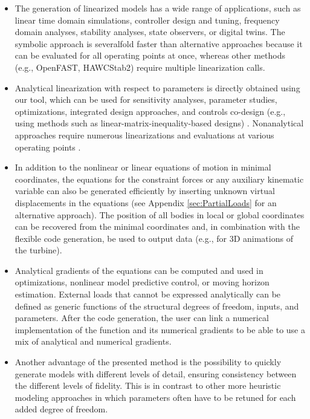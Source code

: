 \documentclass[wes, manuscript]{copernicus}
\begin{document}
\begin{itemize}
\item The generation of linearized models has a wide range of applications, such as linear time domain simulations, controller design and tuning, frequency domain analyses, stability analyses, state observers, or digital twins.
The symbolic approach is severalfold faster than alternative approaches because it can be evaluated for all operating points at once, whereas other methods (e.g., OpenFAST, HAWCStab2) require multiple linearization calls.

\item Analytical linearization with respect to parameters is directly obtained using our tool, which can be used for sensitivity analyses, parameter studies, optimizations, integrated design approaches, and controls co-design (e.g., using methods such as linear-matrix-inequality-based designs) \citep{Poschke:2020}.  Nonanalytical approaches require numerous linearizations and evaluations at various operating points \citep{Jonkman:2022lin}.

\item In addition to the nonlinear or linear equations of motion in minimal coordinates, the equations for the constraint forces or any auxiliary kinematic variable can also be generated efficiently by inserting unknown virtual displacements in the equations (see Appendix \ref{sec:PartialLoads} for an alternative approach). 
The position of all bodies in local or global coordinates can be recovered from the minimal coordinates and, in combination with the flexible code generation, be used to output data (e.g., for 3D animations of the turbine). 

\item Analytical gradients of the equations can be computed and used in optimizations,
nonlinear model predictive control, or moving horizon estimation.
    External loads that cannot be expressed analytically can be defined as generic functions of the structural degrees of freedom, inputs, and parameters.
    After the code generation, the user can link a numerical implementation of the function and its numerical gradients to be able to use a mix of analytical and numerical gradients.

\item Another advantage of the presented method is the possibility to quickly generate models with different levels of detail, ensuring consistency between the different levels of fidelity.
This is in contrast to other more heuristic modeling approaches in which parameters often have to be retuned for each added degree of freedom.


\end{itemize}
\end{document}
